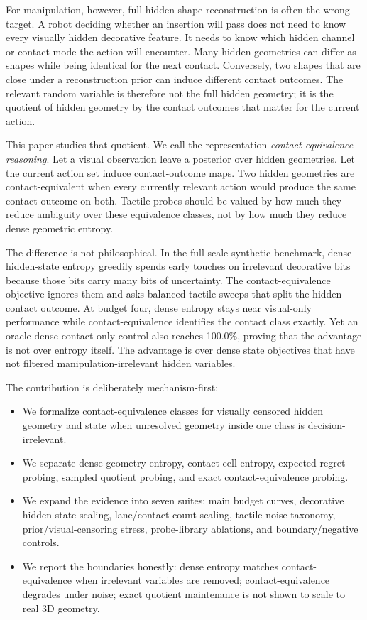 \documentclass{article}
\begin{document}
For manipulation, however, full hidden-shape reconstruction is often the wrong target. A robot deciding whether an insertion will pass does not need to know every visually hidden decorative feature. It needs to know which hidden channel or contact mode the action will encounter. Many hidden geometries can differ as shapes while being identical for the next contact. Conversely, two shapes that are close under a reconstruction prior can induce different contact outcomes. The relevant random variable is therefore not the full hidden geometry; it is the quotient of hidden geometry by the contact outcomes that matter for the current action.

This paper studies that quotient. We call the representation \emph{contact-equivalence reasoning}. Let a visual observation leave a posterior over hidden geometries. Let the current action set induce contact-outcome maps. Two hidden geometries are contact-equivalent when every currently relevant action would produce the same contact outcome on both. Tactile probes should be valued by how much they reduce ambiguity over these equivalence classes, not by how much they reduce dense geometric entropy.

The difference is not philosophical. In the full-scale synthetic benchmark, dense hidden-state entropy greedily spends early touches on irrelevant decorative bits because those bits carry many bits of uncertainty. The contact-equivalence objective ignores them and asks balanced tactile sweeps that split the hidden contact outcome. At budget four, dense entropy stays near visual-only performance while contact-equivalence identifies the contact class exactly. Yet an oracle dense contact-only control also reaches 100.0\%, proving that the advantage is not over entropy itself. The advantage is over dense state objectives that have not filtered manipulation-irrelevant hidden variables.

The contribution is deliberately mechanism-first:

\begin{itemize}
    \item We formalize contact-equivalence classes for visually censored hidden geometry and state when unresolved geometry inside one class is decision-irrelevant.
    \item We separate dense geometry entropy, contact-cell entropy, expected-regret probing, sampled quotient probing, and exact contact-equivalence probing.
    \item We expand the evidence into seven suites: main budget curves, decorative hidden-state scaling, lane/contact-count scaling, tactile noise taxonomy, prior/visual-censoring stress, probe-library ablations, and boundary/negative controls.
    \item We report the boundaries honestly: dense entropy matches contact-equivalence when irrelevant variables are removed; contact-equivalence degrades under noise; exact quotient maintenance is not shown to scale to real 3D geometry.
\end{itemize}
\end{document}
